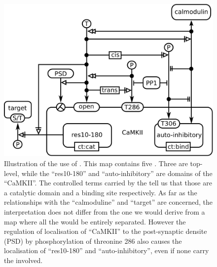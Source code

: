 \begin{figure}[H]
  \centering
  \includegraphics[scale = 0.5]{examples/ex-domain}
  \caption{Illustration of the use of . This map contains five . Three are top-level, while the  ``res10-180'' and ``auto-inhibitory'' are domains of the  ``CaMKII''. The controlled terms carried by the  tell us that those  are a catalytic domain and a binding site respectively.	As far as the relationships with the  ``calmoduline'' and ``target'' are concerned, the interpretation does not differ from the one we would derive from a map where all the  would be entirely separated. However the regulation of localisation of ``CaMKII'' to the post-synaptic densite (PSD) by phosphorylation of threonine 286 also causes the localisation of ``res10-180'' and ``auto-inhibitory'', even if none carry the  involved.}
  \label{fig:ex-domain}
\end{figure}

\normalcolor